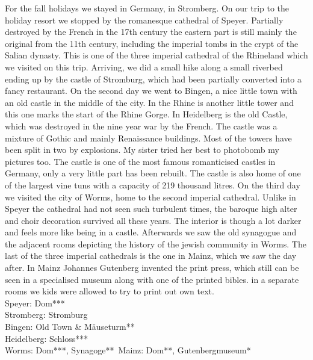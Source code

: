 For the fall holidays we stayed in Germany, in Stromberg. On our trip to the holiday resort we stopped by the romanesque cathedral of Speyer. Partially destroyed by the French in the 17th century the eastern part is still mainly the original from the 11th century, including the imperial tombs in the crypt of the Salian dynasty. This is one of the three imperial cathedral of the Rhineland which we visited on this trip. Arriving, we did a small hike along a small riverbed ending up by the castle of Stromburg, which had been partially converted into a fancy restaurant. On the second day we went to Bingen, a nice little town with an old castle in the middle of the city. In the Rhine is another little tower and this one marks the start of the Rhine Gorge. In Heidelberg is the old Castle, which was destroyed in the nine year war by the French. The castle was a mixture of Gothic and mainly Renaissance buildings. Most of the towers have been split in two by explosions. My sister tried her best to photobomb my pictures too. The castle is one of the most famous romanticised castles in Germany, only a very little part has been rebuilt. The castle is also home of one of the largest vine tuns with a capacity of 219 thousand litres. On the third day we visited the city of Worms, home to the second imperial cathedral. Unlike in Speyer the cathedral had not seen such turbulent times, the baroque high alter and choir decoration survived all these years. The interior is though a lot darker and feels more like being in a castle. Afterwards we saw the old synagogue and the adjacent rooms depicting the history of the jewish community in Worms. The last of the three imperial cathedrals is the one in Mainz, which we saw the day after. In Mainz Johannes Gutenberg invented the print press, which still can be seen in a specialised museum along with one of the printed bibles. in a separate rooms we kids were allowed to try to print out own text.\\ 

Speyer: Dom***\\
Stromberg: Stromburg\\
Bingen: Old Town \& M\"auseturm**\\
Heidelberg: Schloss***\\
Worms: Dom***, Synagoge**\
Mainz: Dom**, Gutenbergmuseum*